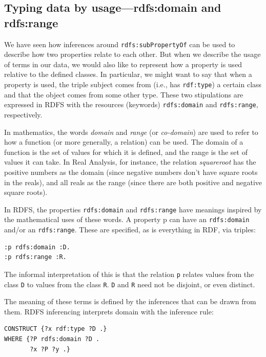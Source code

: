 \subsection{Typing data by usage---rdfs:domain and rdfs:range}
\label{section:domainrange}

We have seen how inferences around \texttt{rdfs:subPropertyOf} can be used to
describe how two properties relate to each other. But when we describe
the usage of terms in our data, we would also like to represent how a
property is used relative to the defined classes. In particular, we
might want to say that when a property is used, the triple subject comes
from (i.e., has \texttt{rdf:type}) a certain class and that the object comes from
some other type. These two stipulations are expressed in RDFS with the
resources (keywords) \texttt{rdfs:domain} and \texttt{rdfs:range}, respectively.

In mathematics, the words \emph{domain} and \emph{range} (or \emph{co-domain}) are used to
refer to how a function (or more generally, a relation) can be used. The
domain of a function is the set of values for which it is defined, and
the range is the set of values it can take. In Real Analysis, for
instance, the relation \emph{squareroot} has the positive numbers as the domain
(since negative numbers don't have square roots in the reals), and all
reals as the range (since there are both positive and negative square
roots).

In RDFS, the properties \texttt{rdfs:domain} and \texttt{rdfs:range} have meanings
inspired by the mathematical uses of these words. A property p can have
an \texttt{rdfs:domain} and/or an \texttt{rdfs:range}. These are specified, as is
everything in RDF, via triples:

\begin{lstlisting}
:p rdfs:domain :D.
:p rdfs:range :R.
\end{lstlisting}

The informal interpretation of this is that the relation \texttt{p} relates
values from the class \texttt{D} to values from the class \texttt{R}. \texttt{D} and \texttt{R} need not be
disjoint, or even distinct.

The meaning of these terms is defined by the inferences that can be
drawn from them. RDFS
inferencing interprets domain with the inference rule:

\begin{lstlisting}
CONSTRUCT {?x rdf:type ?D .}
WHERE {?P rdfs:domain ?D .
       ?x ?P ?y .}
\end{lstlisting}

